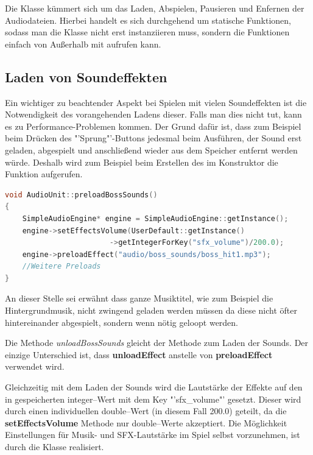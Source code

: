 \label{sec:4_Audiounit}
Die Klasse  kümmert sich um das Laden, Abspielen, Pausieren und Enfernen der Audiodateien. Hierbei handelt es sich durchgehend um statische Funktionen, sodass man die Klasse nicht erst instanziieren muss, sondern die Funktionen einfach von Außerhalb mit  aufrufen kann.

\subsection{Laden von Soundeffekten}
Ein wichtiger zu beachtender Aspekt bei Spielen mit vielen Soundeffekten ist die Notwendigkeit des vorangehenden Ladens dieser. Falls man dies nicht tut, kann es zu Performance-Problemen kommen. Der Grund dafür ist, dass zum Beispiel beim Drücken des "'Sprung"'-Buttons jedesmal beim Ausführen, der Sound erst geladen, abgespielt und anschließend wieder aus dem Speicher entfernt werden würde. Deshalb wird zum Beispiel beim Erstellen des  im Konstruktor die Funktion  aufgerufen.

\begin{lstlisting}[label=lst:preloadBossSounds,
				   language=C++,
				   firstnumber=30,
				   caption=BossLevel-Sounds laden ( AudioUnit.cpp )]
void AudioUnit::preloadBossSounds()
{
	SimpleAudioEngine* engine = SimpleAudioEngine::getInstance();
	engine->setEffectsVolume(UserDefault::getInstance()
						->getIntegerForKey("sfx_volume")/200.0);
	engine->preloadEffect("audio/boss_sounds/boss_hit1.mp3");
	//Weitere Preloads
}
\end{lstlisting}

An dieser Stelle sei erwähnt dass ganze Musiktitel, wie zum Beispiel die Hintergrundmusik, nicht zwingend geladen werden müssen da diese nicht öfter hintereinander abgespielt, sondern wenn nötig geloopt werden. 

Die Methode \textit{unloadBossSounds} gleicht der Methode zum Laden der Sounds. Der einzige Unterschied ist, dass \textbf{unloadEffect} anstelle von \textbf{preloadEffect} verwendet wird.

Gleichzeitig mit dem Laden der Sounds wird die Lautstärke der Effekte auf den in  gespeicherten integer--Wert mit dem Key "'sfx\_volume"' gesetzt. Dieser wird durch einen individuellen double--Wert (in diesem Fall 200.0) geteilt, da die \textbf{setEffectsVolume} Methode nur double--Werte akzeptiert. Die Möglichkeit Einstellungen für Musik- und SFX-Lautstärke im Spiel selbst vorzunehmen, ist durch die Klasse  realisiert. 

